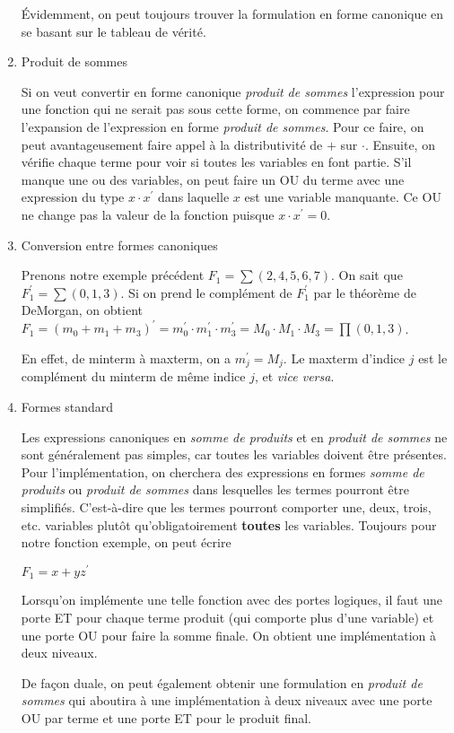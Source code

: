 \documentclass[letter, oneside]{book}
\begin{document}
\begin{enumerate}
Évidemment, on peut toujours trouver la formulation en forme canonique
en se basant sur le tableau de vérité.

\item Produit de sommes
\label{sec:org28477bb}

Si on veut convertir en forme canonique \emph{produit de sommes}
l'expression pour une fonction qui ne serait pas sous cette forme, on
commence par faire l'expansion de l'expression en forme \emph{produit de
sommes}. Pour ce faire, on peut avantageusement faire appel à la
distributivité de \(+\) sur \(\cdot\). Ensuite, on vérifie chaque
terme pour voir si toutes les variables en font partie. S'il manque
une ou des variables, on peut faire un OU du terme avec une expression
du type \(x \cdot x^\prime\) dans laquelle \(x\) est une variable
manquante. Ce OU ne change pas la valeur de la fonction puisque \(x
\cdot x^\prime = 0\).

\item Conversion entre formes canoniques
\label{sec:org9395fa5}

Prenons notre exemple précédent \(F_1 = \sum (2, 4, 5, 6, 7)\). On
sait que \(F_1^\prime = \sum (0,1,3)\). Si on prend le complément de
\(F_1^\prime\) par le théorème de DeMorgan, on obtient \(F_1 = (m_0 +
m_1 + m_3)^\prime = m_0^\prime \cdot m_1^\prime \cdot m_3^\prime = M_0
\cdot M_1 \cdot M_3 = \prod (0,1,3)\).

En effet, de minterm à maxterm, on a \(m_j^\prime = M_j\). Le maxterm
d'indice \(j\) est le complément du minterm de même indice \(j\), et
\emph{vice versa}.

\item Formes standard
\label{sec:org8f37f13}

Les expressions canoniques en \emph{somme de produits} et en \emph{produit de
sommes} ne sont généralement pas simples, car toutes les variables
doivent être présentes. Pour l'implémentation, on cherchera des
expressions en formes \emph{somme de produits} ou \emph{produit de sommes} dans
lesquelles les termes pourront être simplifiés. C'est-à-dire que les
termes pourront comporter une, deux, trois, etc. variables plutôt
qu'obligatoirement \textbf{toutes} les variables. Toujours pour notre
fonction exemple, on peut écrire

\(F_1 = x + y z^\prime\)

Lorsqu'on implémente une telle fonction avec des portes logiques, il
faut une porte ET pour chaque terme produit (qui comporte plus d'une
variable) et une porte OU pour faire la somme finale. On obtient une
implémentation à deux niveaux.

De façon duale, on peut également obtenir une formulation en \emph{produit
de sommes} qui aboutira à une implémentation à deux niveaux avec une
porte OU par terme et une porte ET pour le produit final.
\end{enumerate}
\end{document}
